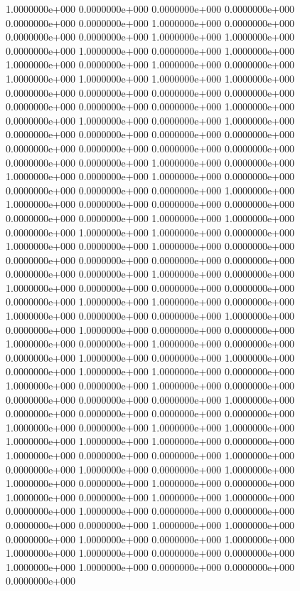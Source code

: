   1.0000000e+000  0.0000000e+000  0.0000000e+000  0.0000000e+000  0.0000000e+000
  0.0000000e+000  1.0000000e+000  0.0000000e+000  0.0000000e+000  0.0000000e+000
  1.0000000e+000  1.0000000e+000  0.0000000e+000  1.0000000e+000  0.0000000e+000
  1.0000000e+000  1.0000000e+000  0.0000000e+000  1.0000000e+000  0.0000000e+000
  1.0000000e+000  1.0000000e+000  1.0000000e+000  1.0000000e+000  0.0000000e+000
  0.0000000e+000  0.0000000e+000  0.0000000e+000  0.0000000e+000  0.0000000e+000
  0.0000000e+000  1.0000000e+000  0.0000000e+000  1.0000000e+000  0.0000000e+000
  1.0000000e+000  0.0000000e+000  0.0000000e+000  0.0000000e+000  0.0000000e+000
  0.0000000e+000  0.0000000e+000  0.0000000e+000  0.0000000e+000  0.0000000e+000
  0.0000000e+000  1.0000000e+000  0.0000000e+000  1.0000000e+000  0.0000000e+000
  1.0000000e+000  0.0000000e+000  0.0000000e+000  0.0000000e+000  0.0000000e+000
  1.0000000e+000  1.0000000e+000  0.0000000e+000  0.0000000e+000  0.0000000e+000
  0.0000000e+000  0.0000000e+000  1.0000000e+000  1.0000000e+000  0.0000000e+000
  1.0000000e+000  1.0000000e+000  0.0000000e+000  1.0000000e+000  0.0000000e+000
  1.0000000e+000  0.0000000e+000  0.0000000e+000  0.0000000e+000  0.0000000e+000
  0.0000000e+000  0.0000000e+000  0.0000000e+000  1.0000000e+000  0.0000000e+000
  1.0000000e+000  0.0000000e+000  0.0000000e+000  0.0000000e+000  0.0000000e+000
  1.0000000e+000  1.0000000e+000  0.0000000e+000  1.0000000e+000  0.0000000e+000
  0.0000000e+000  1.0000000e+000  0.0000000e+000  1.0000000e+000  0.0000000e+000
  0.0000000e+000  1.0000000e+000  0.0000000e+000  1.0000000e+000  0.0000000e+000
  0.0000000e+000  1.0000000e+000  0.0000000e+000  1.0000000e+000  0.0000000e+000
  1.0000000e+000  1.0000000e+000  0.0000000e+000  1.0000000e+000  0.0000000e+000
  1.0000000e+000  0.0000000e+000  0.0000000e+000  0.0000000e+000  0.0000000e+000
  1.0000000e+000  0.0000000e+000  0.0000000e+000  0.0000000e+000  0.0000000e+000
  1.0000000e+000  0.0000000e+000  1.0000000e+000  1.0000000e+000  1.0000000e+000
  1.0000000e+000  1.0000000e+000  0.0000000e+000  1.0000000e+000  0.0000000e+000
  0.0000000e+000  1.0000000e+000  0.0000000e+000  1.0000000e+000  0.0000000e+000
  1.0000000e+000  1.0000000e+000  0.0000000e+000  1.0000000e+000  0.0000000e+000
  1.0000000e+000  0.0000000e+000  1.0000000e+000  1.0000000e+000  0.0000000e+000
  1.0000000e+000  0.0000000e+000  0.0000000e+000  0.0000000e+000  0.0000000e+000
  1.0000000e+000  1.0000000e+000  0.0000000e+000  1.0000000e+000  0.0000000e+000
  1.0000000e+000  1.0000000e+000  1.0000000e+000  0.0000000e+000  0.0000000e+000
  1.0000000e+000  1.0000000e+000  0.0000000e+000  0.0000000e+000  0.0000000e+000
